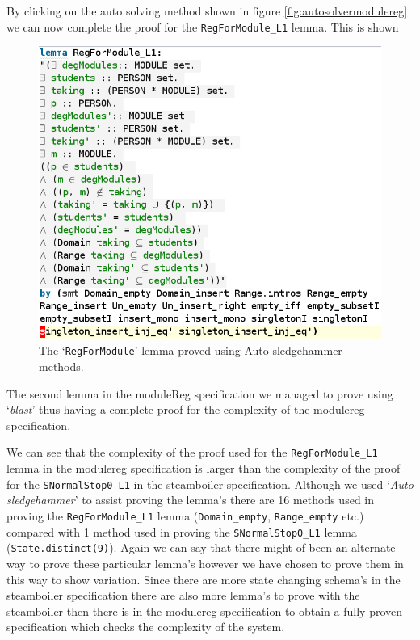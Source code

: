 By clicking on the auto solving method shown in figure
\ref{fig:autosolvermodulereg} we can now complete the proof for the
\verb|RegForModule_L1| lemma. This is shown 

\begin{figure}[H]
\centering
\includegraphics[scale=0.5]{Figures/Evaluation/provenmodulelemma.png}
\caption{The `\texttt{RegForModule}' lemma proved using Auto sledgehammer methods. \label{fig:solvedmodulelemma}}
\end{figure}

The second lemma in the moduleReg specification we managed to prove using
`\emph{blast}' thus having a complete proof for the complexity of the modulereg
specification.

We can see that the complexity of the proof used for the \verb|RegForModule_L1|
lemma in the modulereg specification is larger than the complexity of the proof
for the \verb|SNormalStop0_L1| in the steamboiler specification. Although we
used `\emph{Auto sledgehammer}' to assist proving the lemma's there are 16
methods used in proving the \verb|RegForModule_L1| lemma (\verb|Domain_empty|,
\verb|Range_empty| etc.) compared with 1 method used in proving the
\verb|SNormalStop0_L1| lemma (\verb|State.distinct(9)|). Again we can say that
there might of been an alternate way to prove these particular lemma's however
we have chosen to prove them in this way to show variation. Since there are more
state changing schema's in the steamboiler specification there are also more
lemma's to prove with the steamboiler then there is in the modulereg
specification to obtain a fully proven specification which checks the complexity
of the system.

